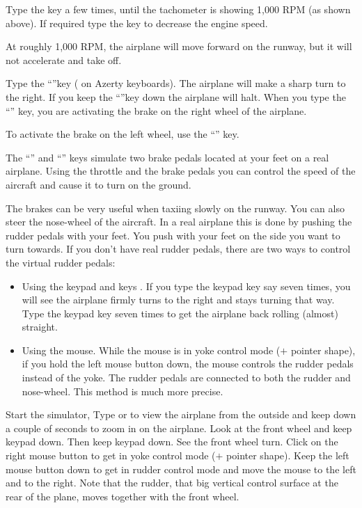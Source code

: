Type the  key a few times,
until the tachometer is showing 1,000 RPM (as shown above). If required
type the  key to decrease the engine speed.

At roughly 1,000 RPM, the airplane will move forward on the runway, but it will 
not accelerate and take off.

 Type the ``''key ( on 
Azerty keyboards). The airplane will make a sharp turn to the right. If you 
keep the ``''key down the airplane will halt. When you type the 
``'' key, you are activating the brake on the right wheel of the 
airplane. 

 To activate the brake on the left 
wheel, use the ``\key{,}'' key. 

 The ``\key{,}'' and ``''  keys simulate two brake pedals 
located at your feet on a real airplane. Using the throttle and the brake pedals
you can control the speed of the aircraft and cause it to turn on the ground. 

The brakes can be very useful when taxiing slowly on the runway. You can also
steer the nose-wheel of the aircraft. In a real airplane this is done by pushing
the rudder pedals with your feet. You push with your feet on the side you want 
to turn towards. If you don't have real rudder pedals, there are two ways to 
control the virtual rudder pedals:
\begin{itemize}
	\item Using the keypad   and  keys 
  . If you type the keypad  key say 
  seven times, you will see the airplane firmly turns to the right and 
  stays turning that way. Type the keypad  key seven times to get the 
  airplane back rolling (almost) straight.
	\item Using the mouse. While the mouse is in yoke control mode 
  ($+$ pointer shape), if you hold the left mouse button down, the mouse 
  controls the rudder pedals instead of the yoke. The rudder pedals are 
  connected to both the rudder  
   and nose-wheel. This method is much more precise.
\end{itemize}
 
Start the simulator, Type  or  to view the airplane from
the outside and keep  down a couple of seconds to zoom in on the
airplane. Look at the front wheel and keep keypad  down. Then
keep keypad  down. See the front wheel turn. Click on the
right mouse button to get in yoke control mode ($+$ pointer shape).
Keep the left mouse button down to get in rudder control mode and move
the mouse to the left and to the right. Note that the rudder, that big
vertical control surface at the rear of the plane, moves together with
the front wheel.

